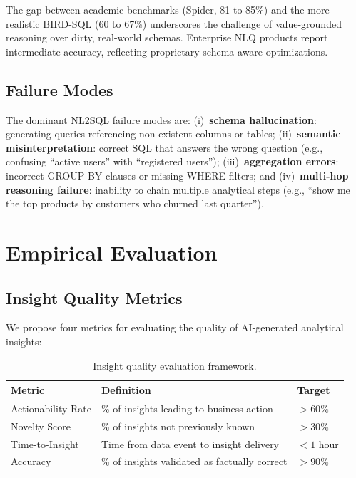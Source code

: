 \documentclass[12pt, a4paper]{article}
\begin{document}
The gap between academic benchmarks (Spider, 81 to 85\%) and the more realistic BIRD-SQL (60 to 67\%) underscores the challenge of value-grounded reasoning over dirty, real-world schemas. Enterprise NLQ products report intermediate accuracy, reflecting proprietary schema-aware optimizations.

\subsection{Failure Modes}
\begin{sloppypar}
The dominant NL2SQL failure modes are: (i)~\textbf{schema hallucination}: generating queries referencing non-existent columns or tables; (ii)~\textbf{semantic misinterpretation}: correct SQL that answers the wrong question (e.g., confusing ``active users'' with ``registered users''); (iii)~\textbf{aggregation errors}: incorrect GROUP BY clauses or missing WHERE filters; and (iv)~\textbf{multi-hop reasoning failure}: inability to chain multiple analytical steps (e.g., ``show me the top products by customers who churned last quarter'').
\end{sloppypar}

\section{Empirical Evaluation}\label{sec:evaluation}

\subsection{Insight Quality Metrics}
We propose four metrics for evaluating the quality of AI-generated analytical insights:

\begin{table}[ht]
\centering
\caption{Insight quality evaluation framework.}
\label{tab:insight-quality}
\begin{tabular}{lll}
\toprule
\textbf{Metric} & \textbf{Definition} & \textbf{Target} \\
\midrule
Actionability Rate & \% of insights leading to business action  & $>60\%$ \\
Novelty Score      & \% of insights not previously known         & $>30\%$ \\
Time-to-Insight    & Time from data event to insight delivery    & $<1$ hour \\
Accuracy           & \% of insights validated as factually correct & $>90\%$ \\
\bottomrule
\end{tabular}
\end{table}
\end{document}
